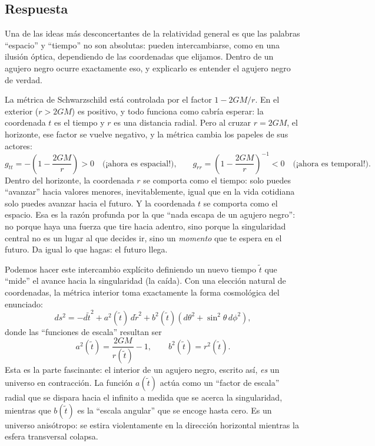 \documentclass[11pt,a4paper]{article}
\begin{document}
\subsection*{Respuesta}

Una de las ideas más desconcertantes de la relatividad general es que las palabras ``espacio'' y ``tiempo'' no son absolutas: pueden intercambiarse, como en una ilusión óptica, dependiendo de las coordenadas que elijamos. Dentro de un agujero negro ocurre exactamente eso, y explicarlo es entender el agujero negro de verdad.

La métrica de Schwarzschild está controlada por el factor $1-2GM/r$. En el exterior ($r>2GM$) es positivo, y todo funciona como cabría esperar: la coordenada $t$ es el tiempo y $r$ es una distancia radial. Pero al cruzar $r=2GM$, el horizonte, ese factor se vuelve negativo, y la métrica cambia los papeles de sus actores:
\[
g_{tt} = -\left(1-\frac{2GM}{r}\right) > 0 \quad\text{(¡ahora es espacial!),} \qquad
g_{rr} = \left(1-\frac{2GM}{r}\right)^{-1} < 0 \quad\text{(¡ahora es temporal!).}
\]
Dentro del horizonte, la coordenada $r$ se comporta como el tiempo: solo puedes ``avanzar'' hacia valores menores, inevitablemente, igual que en la vida cotidiana solo puedes avanzar hacia el futuro. Y la coordenada $t$ se comporta como el espacio. Esa es la razón profunda por la que ``nada escapa de un agujero negro'': no porque haya una fuerza que tire hacia adentro, sino porque la singularidad central no es un lugar al que decides ir, sino un \emph{momento} que te espera en el futuro. Da igual lo que hagas: el futuro llega.

Podemos hacer este intercambio explícito definiendo un nuevo tiempo $\tilde{t}$ que ``mide'' el avance hacia la singularidad (la caída). Con una elección natural de coordenadas, la métrica interior toma exactamente la forma cosmológica del enunciado:
\[
ds^2 = -d\tilde{t}^{2} + a^2(\tilde{t})\,d\tilde{r}^{2} + b^2(\tilde{t})\left(d\theta^2+\sin^2\theta\,d\phi^2\right),
\]
donde las ``funciones de escala'' resultan ser
\[
a^2(\tilde{t}) = \frac{2GM}{r(\tilde{t})} - 1, \qquad b^2(\tilde{t}) = r^2(\tilde{t}).
\]
Esta es la parte fascinante: el interior de un agujero negro, escrito así, \emph{es} un universo en contracción. La función $a(\tilde{t})$ actúa como un ``factor de escala'' radial que se dispara hacia el infinito a medida que se acerca la singularidad, mientras que $b(\tilde{t})$ es la ``escala angular'' que se encoge hasta cero. Es un universo anisótropo: se estira violentamente en la dirección horizontal mientras la esfera transversal colapsa.
\end{document}
